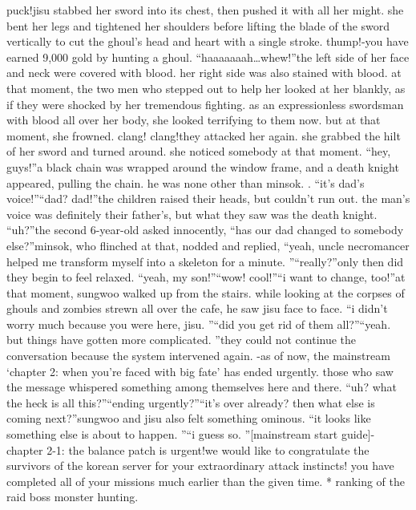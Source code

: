 puck!jisu stabbed her sword into its chest, then pushed it with all her might.
she bent her legs and tightened her shoulders before lifting the blade of the sword vertically to cut the ghoul’s head and heart with a single stroke.
thump!-you have earned 9,000 gold by hunting a ghoul.
“haaaaaaah…whew!”the left side of her face and neck were covered with blood.
 her right side was also stained with blood.
at that moment, the two men who stepped out to help her looked at her blankly, as if they were shocked by her tremendous fighting.
as an expressionless swordsman with blood all over her body, she looked terrifying to them now.
 but at that moment, she frowned.
clang! clang!they attacked her again.
 she grabbed the hilt of her sword and turned around.
she noticed somebody at that moment.
“hey, guys!”a black chain was wrapped around the window frame, and a death knight appeared, pulling the chain.
 he was none other than minsok.
 .
“it’s dad’s voice!”“dad? dad!”the children raised their heads, but couldn’t run out.
 the man’s voice was definitely their father’s, but what they saw was the death knight.
“uh?”the second 6-year-old asked innocently, “has our dad changed to somebody else?”minsok, who flinched at that, nodded and replied, “yeah, uncle necromancer helped me transform myself into a skeleton for a minute.
”“really?”only then did they begin to feel relaxed.
“yeah, my son!”“wow! cool!”“i want to change, too!”at that moment, sungwoo walked up from the stairs.
 while looking at the corpses of ghouls and zombies strewn all over the cafe, he saw jisu face to face.
“i didn’t worry much because you were here, jisu.
”“did you get rid of them all?”“yeah.
 but things have gotten more complicated.
”they could not continue the conversation because the system intervened again.
-as of now, the mainstream ‘chapter 2: when you’re faced with big fate’ has ended urgently.
those who saw the message whispered something among themselves here and there.
“uh? what the heck is all this?”“ending urgently?”“it’s over already? then what else is coming next?”sungwoo and jisu also felt something ominous.
“it looks like something else is about to happen.
”“i guess so.
”[mainstream start guide]-chapter 2-1: the balance patch is urgent!we would like to congratulate the survivors of the korean server for your extraordinary attack instincts! you have completed all of your missions much earlier than the given time.
* ranking of the raid boss monster hunting.


